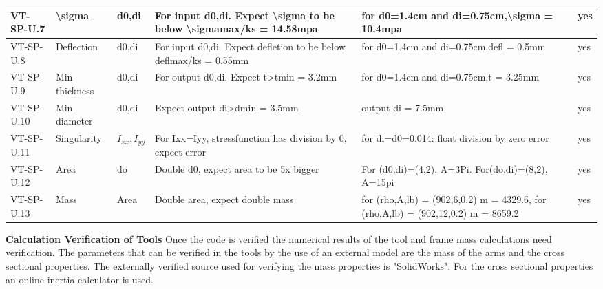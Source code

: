 \begin{table}[h!]
{\begin{tabular}{|p{2cm}|p{2cm}|p{2cm}|p{5cm}|p{6cm}|l|}
VT-SP-U.7  & \textbackslash{}sigma & d0,di           & For input d0,di. Expect \textbackslash{}sigma to be below \textbackslash{}sigmamax/ks = 14.58mpa & for d0=1.4cm and di=0.75cm,\textbackslash{}sigma   = 10.4mpa                        &\cellcolor[HTML]{C1FFC1} yes       \\ \hline
VT-SP-U.8  & Deflection            & d0,di           & For input d0,di. Expect defletion  to be below deflmax/ks = 0.55mm                               & for d0=1.4cm and di=0.75cm,defl =   0.5mm                                           &\cellcolor[HTML]{C1FFC1} yes       \\ \hline
VT-SP-U.9  & Min thickness         & d0,di           & For output d0,di. Expect t\textgreater{}tmin   = 3.2mm                                           & for d0=1.4cm and di=0.75cm,t =   3.25mm                                             &\cellcolor[HTML]{C1FFC1} yes       \\ \hline
VT-SP-U.10 & Min diameter          & d0,di           & Expect output di\textgreater{}dmin = 3.5mm                                                       & output di = 7.5mm                                                                   &\cellcolor[HTML]{C1FFC1} yes       \\ \hline
VT-SP-U.11 & Singularity           & $I_{xx},I_{yy}$ & For Ixx=Iyy, stressfunction has division by 0, expect error                                      & for di=d0=0.014: float division by   zero error                                     &\cellcolor[HTML]{C1FFC1} yes       \\ \hline
VT-SP-U.12 & Area                  & do              & Double d0, expect area to be 5x  bigger                                                          & For (d0,di)=(4,2), A=3Pi.   For(do,di)=(8,2), A=15pi                                &\cellcolor[HTML]{C1FFC1} yes       \\ \hline
VT-SP-U.13 & Mass                  & Area            & Double area, expect double mass                                                                  & for (rho,A,lb) = (902,6,0.2) m =   4329.6, for (rho,A,lb) = (902,12,0.2) m = 8659.2 &\cellcolor[HTML]{C1FFC1} yes       \\ \hline

\end{tabular}%
}
\end{table}

\textbf{Calculation Verification of Tools} \newline
Once the code is verified the numerical results of the tool and frame mass calculations need verification. The parameters that can be verified in the tools by the use of an external model are the mass of the arms and the cross sectional properties. The externally verified source used for verifying the mass properties is "SolidWorks". For the cross sectional properties an online inertia calculator \cite{Ixxcalc} is used. 

